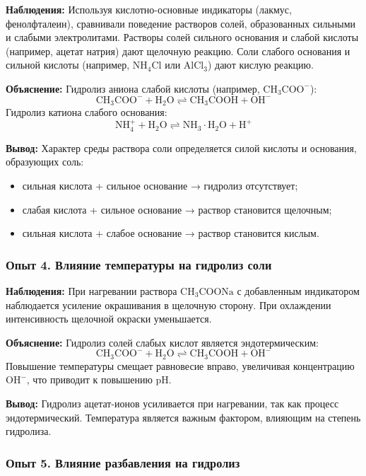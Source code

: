 \documentclass[a4paper,12pt]{article}
\begin{document}
	\textbf{Наблюдения:}
	Используя кислотно-основные индикаторы (лакмус, фенолфталеин), сравнивали 
	поведение растворов солей, образованных сильными и слабыми электролитами. 
	Растворы солей сильного основания и слабой кислоты (например, ацетат натрия) 
	дают щелочную реакцию. Соли слабого основания и сильной кислоты 
	(например, $\mathrm{NH_4Cl}$ или $\mathrm{AlCl_3}$) дают кислую реакцию.
	
	\textbf{Объяснение:}
	Гидролиз аниона слабой кислоты (например, $\mathrm{CH_3COO^-}$):
	\[
	\mathrm{CH_3COO^- + H_2O \rightleftharpoons CH_3COOH + OH^-}
	\]
	Гидролиз катиона слабого основания:
	\[
	\mathrm{NH_4^+ + H_2O \rightleftharpoons NH_3 \cdot H_2O + H^+}
	\]
	
	\textbf{Вывод:}
	Характер среды раствора соли определяется силой кислоты и основания, образующих соль:  
	\begin{itemize}
		\item сильная кислота + сильное основание → гидролиз отсутствует;
		\item слабая кислота + сильное основание → раствор становится щелочным;
		\item сильная кислота + слабое основание → раствор становится кислым.
	\end{itemize}
	
	\subsubsection*{Опыт 4. Влияние температуры на гидролиз соли}
	
	\textbf{Наблюдения:}
	При нагревании раствора $\mathrm{CH_3COONa}$ с добавленным индикатором наблюдается 
	усиление окрашивания в щелочную сторону. При охлаждении интенсивность 
	щелочной окраски уменьшается.
	
	\textbf{Объяснение:}
	Гидролиз солей слабых кислот является эндотермическим:
	\[
	\mathrm{CH_3COO^- + H_2O \rightleftharpoons CH_3COOH + OH^-}
	\]
	Повышение температуры смещает равновесие вправо, увеличивая концентрацию $\mathrm{OH^-}$,  
	что приводит к повышению pH.
	
	\textbf{Вывод:}
	Гидролиз ацетат-ионов усиливается при нагревании, так как процесс эндотермический.
	Температура является важным фактором, влияющим на степень гидролиза.
	
	\subsubsection*{Опыт 5. Влияние разбавления на гидролиз}
	
\end{document}
